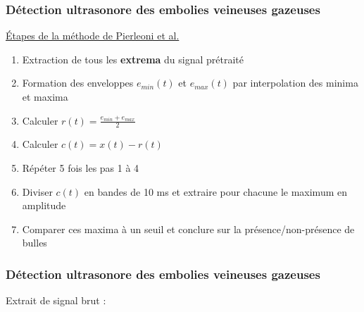 \documentclass{beamer}
\begin{document}
\begin{frame}
\frametitle{Détection ultrasonore des embolies veineuses gazeuses}


\underline{\'Etapes de la méthode de Pierleoni et al.}
\vspace{0.2cm}
\begin{enumerate}
\item Extraction de tous les \textbf{extrema} du signal prétraité
\vspace{0.2cm}
\item Formation des enveloppes $e_{min}(t)$ et $e_{max}(t)$ par interpolation des minima et maxima
\vspace{0.2cm}
\item Calculer $r(t) = \frac{\displaystyle e_{min} + e_{max}}{\displaystyle 2}$
\vspace{0.2cm}
\item Calculer $c(t) = x(t) - r(t)$
\vspace{0.2cm}
\item Répéter 5 fois les pas 1 à 4 
\vspace{0.2cm}
\item Diviser $c(t)$  en bandes de 10 ms et extraire pour chacune le maximum en amplitude
\item Comparer ces maxima à un seuil et conclure sur la présence/non-présence de bulles
\end{enumerate}

\end{frame}

\begin{frame}
\frametitle{Détection ultrasonore des embolies veineuses gazeuses}
Extrait de signal brut :
\begin{center}
\end{center}

\end{frame}
\end{document}
